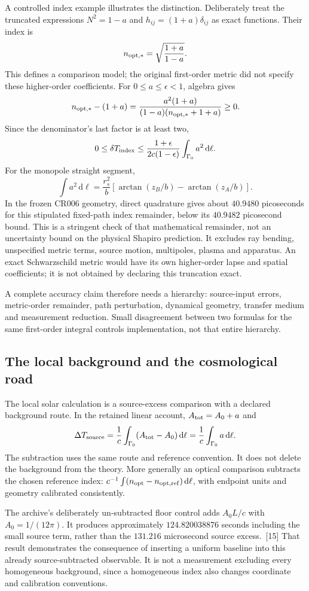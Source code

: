 \documentclass[10pt,twocolumn,letterpaper]{article}
\newcommand{\dd}{\mathrm{d}}
\begin{document}
A controlled index example illustrates the distinction. Deliberately treat the truncated expressions $N^2=1-a$ and $h_{ij}=(1+a)\delta_{ij}$ as exact functions. Their index is
\[
 n_{\rm opt,*} =\sqrt{\frac{1+a}{1-a}}.
\]
This defines a comparison model; the original first-order metric did not specify these higher-order coefficients. For $0\leq a\leq\epsilon<1$, algebra gives
\[
 n_{\rm opt,*}-(1+a)=\frac{a^2(1+a)}{(1-a)(n_{\rm opt,*}+1+a)}\geq 0.
\]
Since the denominator's last factor is at least two,
\[
 0\leq\delta T_{\rm index}
 \leq\frac{1+\epsilon}{2c(1-\epsilon)}\int_{\Gamma_0}a^2\,\dd\ell.
\]
For the monopole straight segment,
\[
 \int a^2\,\dd\ell
 =\frac{r_s^2}{b}
  \left[\arctan(z_B/b)-\arctan(z_A/b)\right].
\]
In the frozen CR006 geometry, direct quadrature gives about $40.9480$ picoseconds for this stipulated fixed-path index remainder, below its $40.9482$ picosecond bound. This is a stringent check of that mathematical remainder, not an uncertainty bound on the physical Shapiro prediction. It excludes ray bending, unspecified metric terms, source motion, multipoles, plasma and apparatus. An exact Schwarzschild metric would have its own higher-order lapse and spatial coefficients; it is not obtained by declaring this truncation exact.

A complete accuracy claim therefore needs a hierarchy: source-input errors, metric-order remainder, path perturbation, dynamical geometry, transfer medium and measurement reduction. Small disagreement between two formulas for the same first-order integral controls implementation, not that entire hierarchy.


\subsection{The local background and the cosmological road}
The local solar calculation is a source-excess comparison with a declared background route. In the retained linear account, $A_{\rm tot}=A_0+a$ and
\[
 \Delta T_{\rm source}
 =\frac 1c\int_{\Gamma_0}(A_{\rm tot}-A_0)\,\dd\ell
 =\frac 1c\int_{\Gamma_0}a\,\dd\ell.
\]
The subtraction uses the same route and reference convention. It does not delete the background from the theory. More generally an optical comparison subtracts the chosen reference index: $c^{-1}\int(n_{\rm opt}-n_{\rm opt,ref})\,\dd\ell$, with endpoint units and geometry calibrated consistently.

The archive's deliberately un-subtracted floor control adds $A_0L/c$ with $A_0=1/(12\pi)$. It produces approximately $124.820038876$ seconds including the small source term, rather than the $131.216$ microsecond source excess.~[15] That result demonstrates the consequence of inserting a uniform baseline into this already source-subtracted observable. It is not a measurement excluding every homogeneous background, since a homogeneous index also changes coordinate and calibration conventions.
\end{document}
